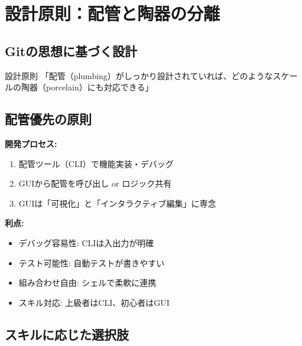 \documentclass[10pt,a4paper,twocolumn]{ltjsarticle}
\begin{document}
\section{設計原則：配管と陶器の分離}

\subsection{Gitの思想に基づく設計}

\begin{itembox}[l]{設計原則}
「配管（plumbing）がしっかり設計されていれば、どのようなスケールの陶器（porcelain）にも対応できる」
\end{itembox}

\vspace{0.5\baselineskip}
\vspace{0.5\baselineskip}

\subsection{配管優先の原則}

\textbf{開発プロセス:}
\begin{enumerate}
\item 配管ツール（CLI）で機能実装・デバッグ
\item GUIから配管を呼び出し or ロジック共有
\item GUIは「可視化」と「インタラクティブ編集」に専念
\end{enumerate}

\textbf{利点:}
\begin{itemize}
\item デバッグ容易性: CLIは入出力が明確
\item テスト可能性: 自動テストが書きやすい
\item 組み合わせ自由: シェルで柔軟に連携
\item スキル対応: 上級者はCLI、初心者はGUI
\end{itemize}

\subsection{スキルに応じた選択肢}
\end{document}
